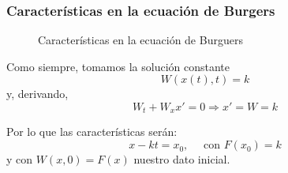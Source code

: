 		\subsubsection{Características en la ecuación de Burgers}

			\begin{figure}[hbtp]
				\centering
				\caption{Características en la ecuación de Burguers}
				\label{fig:CaracteristicasBurger}
			\end{figure}

			Como siempre, tomamos la solución constante \[ W(x(t),t) = k \] y, derivando,
			\[ W_t + W_x x' = 0 \Rightarrow x' = W = k \]

			Por lo que las características serán: \[ x-kt = x_0, \quad \text{ con }F(x_0) = k \] y con $W(x,0) = F(x)$ nuestro dato inicial.



		\newpage %


